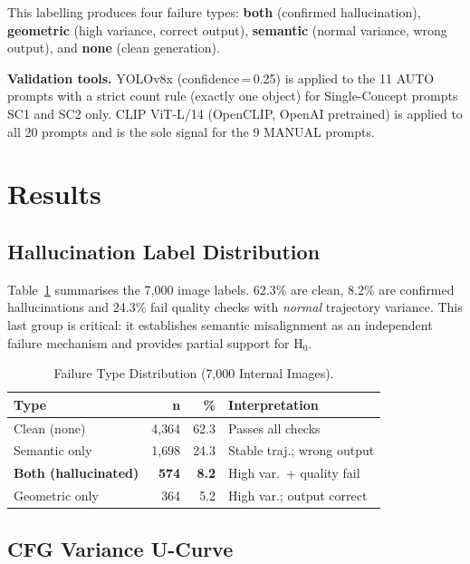 \documentclass[conference]{IEEEtran}
\begin{document}
This labelling produces four failure types: \textbf{both} (confirmed
hallucination), \textbf{geometric} (high variance, correct output),
\textbf{semantic} (normal variance, wrong output), and \textbf{none}
(clean generation).

\textbf{Validation tools.} YOLOv8x (confidence\,=\,0.25) is applied
to the 11 AUTO prompts with a strict count rule (exactly one object)
for Single-Concept prompts SC1 and SC2 only. CLIP ViT-L/14
(OpenCLIP, OpenAI pretrained) is applied to all 20 prompts and is
the sole signal for the 9 MANUAL prompts.

\section{Results}
\label{sec:results}

\subsection{Hallucination Label Distribution}

Table~\ref{tab:distribution} summarises the 7{,}000 image labels.
62.3\% are clean, 8.2\% are confirmed hallucinations and 24.3\%
fail quality checks with \emph{normal} trajectory variance. This
last group is critical: it establishes semantic misalignment as
an independent failure mechanism and provides partial support for H$_0$.

\begin{table}[h]
\centering
\caption{Failure Type Distribution (7{,}000 Internal Images).}
\label{tab:distribution}
\small
\begin{tabular}{lrrl}
\toprule
\textbf{Type} & \textbf{n} & \textbf{\%} & \textbf{Interpretation} \\
\midrule
Clean (none)        & 4{,}364 & 62.3 & Passes all checks \\
Semantic only       & 1{,}698 & 24.3 & Stable traj.; wrong output \\
\textbf{Both (hallucinated)} & \textbf{574} & \textbf{8.2} & High var.\ + quality fail \\
Geometric only      &   364 &  5.2 & High var.; output correct \\
\bottomrule
\end{tabular}
\end{table}

\subsection{CFG Variance U-Curve}
\label{sec:ucurve}
\end{document}
